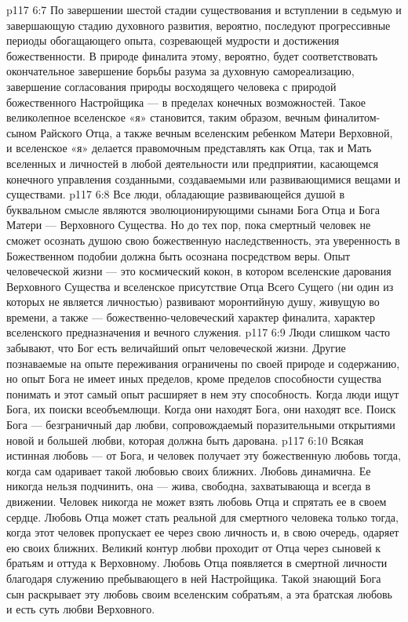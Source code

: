 \vs p117 6:7 По завершении шестой стадии существования и вступлении в седьмую и завершающую стадию духовного развития, вероятно, последуют прогрессивные периоды обогащающего опыта, созревающей мудрости и достижения божественности. В природе финалита этому, вероятно, будет соответствовать окончательное завершение борьбы разума за духовную самореализацию, завершение согласования природы восходящего человека с природой божественного Настройщика --- в пределах конечных возможностей. Такое великолепное вселенское «я» становится, таким образом, вечным финалитом\hyp{}сыном Райского Отца, а также вечным вселенским ребенком Матери Верховной, и вселенское «я» делается правомочным представлять как Отца, так и Мать вселенных и личностей в любой деятельности или предприятии, касающемся конечного управления созданными, создаваемыми или развивающимися вещами и существами.
\vs p117 6:8 Все люди, обладающие развивающейся душой в буквальном смысле являются эволюционирующими сынами Бога Отца и Бога Матери --- Верховного Существа. Но до тех пор, пока смертный человек не сможет осознать душою свою божественную наследственность, эта уверенность в Божественном подобии должна быть осознана посредством веры. Опыт человеческой жизни --- это космический кокон, в котором вселенские дарования Верховного Существа и вселенское присутствие Отца Всего Сущего (ни один из которых не является личностью) развивают моронтийную душу, живущую во времени, а также --- божественно\hyp{}человеческий характер финалита, характер вселенского предназначения и вечного служения.
\vs p117 6:9 \pc Люди слишком часто забывают, что Бог есть величайший опыт человеческой жизни. Другие познаваемые на опыте переживания ограничены по своей природе и содержанию, но опыт Бога не имеет иных пределов, кроме пределов способности существа понимать и этот самый опыт расширяет в нем эту способность. Когда люди ищут Бога, их поиски всеобъемлющи. Когда они находят Бога, они находят все. Поиск Бога --- безграничный дар любви, сопровождаемый поразительными открытиями новой и большей любви, которая должна быть дарована.
\vs p117 6:10 Всякая истинная любовь --- от Бога, и человек получает эту божественную любовь тогда, когда сам одаривает такой любовью своих ближних. Любовь динамична. Ее никогда нельзя подчинить, она --- жива, свободна, захватывающа и всегда в движении. Человек никогда не может взять любовь Отца и спрятать ее в своем сердце. Любовь Отца может стать реальной для смертного человека только тогда, когда этот человек пропускает ее через свою личность и, в свою очередь, одаряет ею своих ближних. Великий контур любви проходит от Отца через сыновей к братьям и оттуда к Верховному. Любовь Отца появляется в смертной личности благодаря служению пребывающего в ней Настройщика. Такой знающий Бога сын раскрывает эту любовь своим вселенским собратьям, а эта братская любовь и есть суть любви Верховного.
